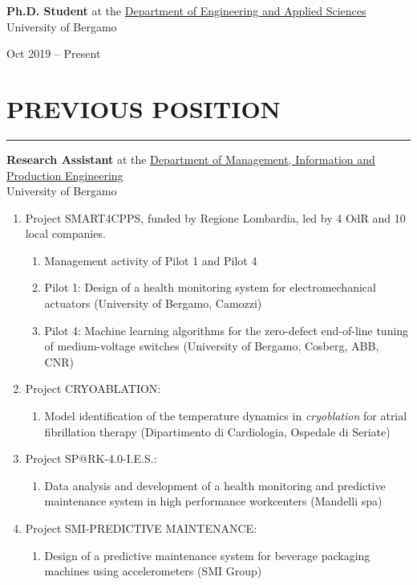 \documentclass[10pt]{article}
\newcommand{\cvsection}[1]{\section*{\centering\normalsize\uppercase{#1}}\vspace{-16pt}\rule{\linewidth}{0.2pt}\vspace{6pt}}
\begin{document}
\noindent
\begin{minipage}[t]{.8\textwidth}
	\textbf{Ph.D. Student} at the \href{https://disa.unibg.it/}{Department of Engineering and Applied Sciences} \\
	University of Bergamo
\end{minipage}%
\hfill\vrule\hfill
\begin{minipage}[t]{.16\textwidth}
	\raggedleft
	Oct 2019 – Present
\end{minipage}

\cvsection{previous position}

\noindent
\begin{minipage}[t]{.8\textwidth}
	\raggedright
	\textbf{Research Assistant} at the \href{https://digip.unibg.it/}{Department of Management, Information and Production Engineering}\\
	University of Bergamo
	\vspace{6pt}
	\begin{enumerate}
		\item Project SMART4CPPS, funded by Regione Lombardia, led by 4 OdR and 10 local companies.
		\begin{enumerate}
			\item Management activity of Pilot 1 and Pilot 4
			\item Pilot 1: Design of a health monitoring system for electromechanical actuators (University of Bergamo, Camozzi)
			\item Pilot 4: Machine learning algorithms for the zero-defect end-of-line tuning of medium-voltage switches (University of Bergamo, Cosberg, ABB, CNR)
		\end{enumerate}
		\item Project CRYOABLATION:
		\begin{enumerate}
			\item Model identification of the temperature dynamics in \textit{cryoblation} for atrial fibrillation therapy (Dipartimento di Cardiologia, Ospedale di Seriate)
		\end{enumerate}
		\item Project SP@RK-4.0-I.E.S.:
		\begin{enumerate}
			\item Data analysis and development of a health monitoring and predictive maintenance system in high performance workcenters (Mandelli spa)
		\end{enumerate}
		\item Project SMI-PREDICTIVE MAINTENANCE:
		\begin{enumerate}
			\item Design of a predictive maintenance system for beverage packaging machines using accelerometers (SMI Group)
		\end{enumerate}
  \end{enumerate}
\end{minipage}%
\end{document}
